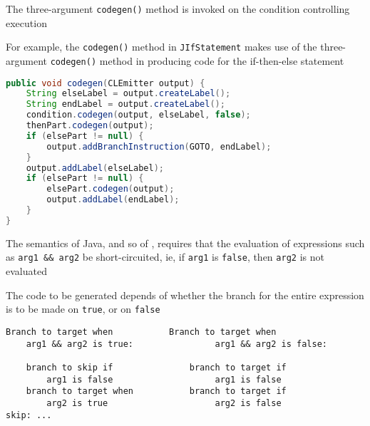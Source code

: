 \documentclass[8pt,a4paper,compress]{beamer}
\begin{document}
\begin{frame}[fragile]
\pause

The three-argument \lstinline{codegen()} method is invoked on the condition controlling execution

\pause
\bigskip

For example, the \lstinline{codegen()} method in \lstinline{JIfStatement} makes use of the three-argument \lstinline{codegen()} method in producing code for the if-then-else statement

\smallskip

\begin{lstlisting}[language=Java,style=focusin]
public void codegen(CLEmitter output) {
    String elseLabel = output.createLabel();
    String endLabel = output.createLabel();
    condition.codegen(output, elseLabel, false);
    thenPart.codegen(output);
    if (elsePart != null) {
        output.addBranchInstruction(GOTO, endLabel);
    }
    output.addLabel(elseLabel);
    if (elsePart != null) {
        elsePart.codegen(output);
        output.addLabel(endLabel);
    }
}
\end{lstlisting}
\end{frame}

\begin{frame}[fragile]
\pause

The semantics of Java, and so of \jmm, requires that the evaluation of expressions such as \lstinline{arg1 && arg2} be short-circuited, ie, if \lstinline{arg1} is \lstinline{false}, then \lstinline{arg2} is not evaluated

\pause
\bigskip

The code to be generated depends of whether the branch for the entire expression is to be made on \lstinline{true}, or on \lstinline{false}

\begin{lstlisting}[language={},style=focusin]
Branch to target when           Branch to target when
    arg1 && arg2 is true:                arg1 && arg2 is false:

    branch to skip if               branch to target if
        arg1 is false                    arg1 is false
    branch to target when           branch to target if
        arg2 is true                     arg2 is false
skip: ...
\end{lstlisting}
\end{frame}
\end{document}
